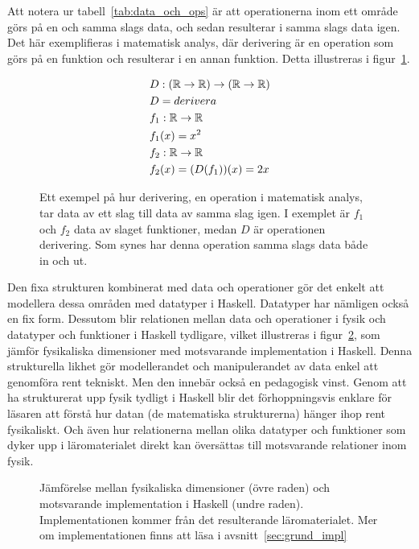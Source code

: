 \captionsetup[figure]{name=Figur}

Att notera ur tabell~\ref{tab:data_och_ops} är att operationerna inom ett område
görs på en och samma slags data, och sedan resulterar i samma slags data igen.
Det här exemplifieras i matematisk analys, där derivering är en operation som
görs på en funktion och resulterar i en annan funktion. Detta illustreras
i figur~\ref{fig:analys_op_exempel}.

\begin{figure}[tph]
\begin{mdframed}
  \vspace{-0.5cm}
\begin{align*}
  &D : (\mathbb{R} \rightarrow \mathbb{R}) \rightarrow (\mathbb{R} \rightarrow \mathbb{R}) \\
  &D = derivera \\
  &f_1 : \mathbb{R} \rightarrow \mathbb{R} \\
  &f_1(x) = x^2 \\
  &f_2 : \mathbb{R} \rightarrow \mathbb{R} \\
  &f_2(x) = (D(f_1))(x) = 2x
\end{align*}
\end{mdframed}
\caption{Ett exempel på hur derivering, en operation i matematisk analys, tar
data av ett slag till data av samma slag igen. I exemplet är $f_1$ och $f_2$
data av slaget funktioner, medan $D$ är operationen derivering. Som synes har
denna operation samma slags data både in och ut.}\label{fig:analys_op_exempel}
\end{figure}

Den fixa strukturen kombinerat med data och operationer gör det enkelt att
modellera dessa områden med datatyper i Haskell. Datatyper har nämligen också en
fix form. Dessutom blir relationen mellan data och operationer i fysik och
datatyper och funktioner i Haskell tydligare, vilket illustreras i
figur~\ref{fig:haskell_fysik_likhet}, som jämför fysikaliska dimensioner med
motsvarande implementation i Haskell. Denna strukturella likhet gör
modellerandet och manipulerandet av data enkel att genomföra rent tekniskt. Men
den innebär också en pedagogisk vinst. Genom att ha strukturerat upp fysik
tydligt i Haskell blir det förhoppningsvis enklare för läsaren att förstå hur
datan (de matematiska strukturerna) hänger ihop rent fysikaliskt. Och även hur relationerna mellan olika
datatyper och funktioner som dyker upp i läromaterialet direkt kan översättas
till motsvarande relationer inom fysik.

\begin{figure}[tph]
  \centering
  \caption{Jämförelse mellan fysikaliska dimensioner (övre raden) och
  motsvarande implementation i Haskell (undre raden). Implementationen kommer
från det resulterande läromaterialet. Mer om implementationen finns att läsa i
avsnitt~\ref{sec:grund_impl}}\label{fig:haskell_fysik_likhet}
\end{figure}

